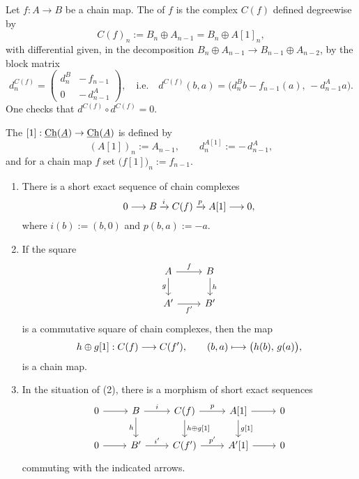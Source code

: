 
\begin{definition*}
	Let \( f: A \to B \) be a chain map. The  of \( f \) is the complex \( C(f) \) defined degreewise by
	\[
		C(f)_n := B_n \oplus A_{n-1} = B_n \oplus A[1]_n,
	\]
	with differential given, in the decomposition \( B_n \oplus A_{n-1} \to B_{n-1} \oplus A_{n-2} \), by the block matrix
	\[
		d^{C(f)}_n =
		\begin{pmatrix}
			d^B_n & -\,f_{n-1}   \\
			0     & -\,d^A_{n-1}
		\end{pmatrix}
		,
		\quad\text{i.e.}\quad
		d^{C(f)}(b,a) = \bigl(d^B_n b - f_{n-1}(a),\,-d^A_{n - 1} a\bigr).
	\]
	One checks that \( d^{C(f)} \circ d^{C(f)} = 0 \).
\end{definition*}

\begin{remark*}
	The  \( [1]: \underline{\mathrm{Ch}}(\underline{A}) \to \underline{\mathrm{Ch}}(\underline{A}) \) is defined by
	\[
		(A[1])_n := A_{n-1}, \qquad d^{A[1]}_n := -\,d^A_{n-1},
	\]
	and for a chain map \( f \) set \( \bigl(f[1]\bigr)_n := f_{n-1} \).
\end{remark*}

\begin{proposition*}
	\mbox{}
	\begin{enumerate}
		\item There is a short exact sequence of chain complexes
			\[
				0 \longrightarrow B \xrightarrow{i} C(f) \xrightarrow{p} A[1] \longrightarrow 0,
			\]
			where \( i(b) := (b,0) \) and \( p(b,a) := -a \).
		\item If the square
			\[
				\begin{tikzcd}
					A \arrow[r,"f"] \arrow[d,"g"'] & B \arrow[d,"h"] \\
					A' \arrow[r,"f'"'] & B'
				\end{tikzcd}
			\]
			is a commutative square of chain complexes, then the map
			\[
				h \oplus g[1]: C(f) \longrightarrow C(f'), \qquad (b,a) \longmapsto \bigl(h(b),\, g(a)\bigr),
			\]
			is a chain map.
		\item In the situation of (2), there is a morphism of short exact sequences
			\[
				\begin{tikzcd}
					0 \arrow[r] & B \arrow[r,"i"] \arrow[d,"h"'] & C(f) \arrow[r,"p"] \arrow[d,"h \oplus g\lbrack1\rbrack"] & A[1] \arrow[r] \arrow[d,"g\lbrack1\rbrack"] & 0 \\
					0 \arrow[r] & B' \arrow[r,"i'"] & C(f') \arrow[r,"p'"] & A'[1] \arrow[r] & 0
				\end{tikzcd}
			\]
			commuting with the indicated arrows.
	\end{enumerate}
\end{proposition*}

